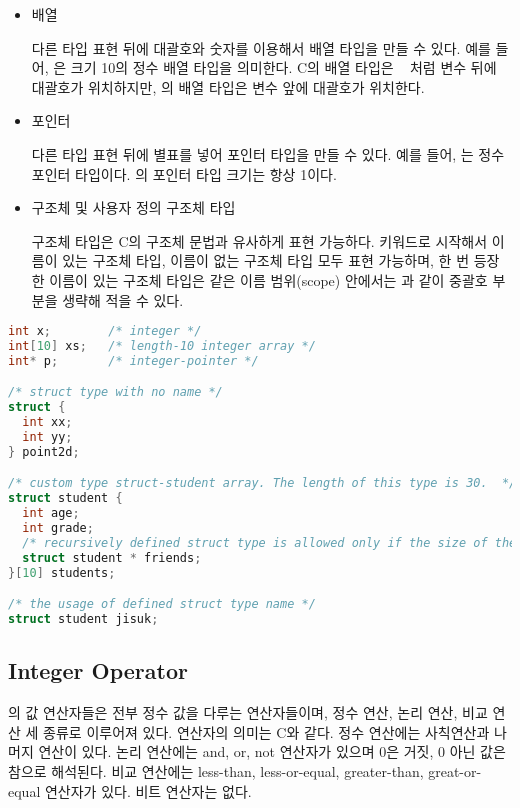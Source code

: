 \begin{itemize}
  \item 배열
  
  다른 타입 표현 뒤에 대괄호와 숫자를 이용해서 배열 타입을 만들 수 있다. 
  예를 들어, \CCint {} \CCrsbracket 은 크기 10의 정수 배열 타입을 의미한다. 
  C의 배열 타입은 \CCint \   \CCrsbracket 처럼 변수 뒤에 대괄호가 위치하지만, 
  \SubC 의 배열 타입은 변수 앞에 대괄호가 위치한다.
  
  \item 포인터
  
  다른 타입 표현 뒤에 별표를 넣어 포인터 타입을 만들 수 있다.
  예를 들어, \CCint \CCasterisk 는 정수 포인터 타입이다.
  \SubC 의 포인터 타입 크기는 항상 1이다. 
  
  \item 구조체 및 사용자 정의 구조체 타입
  
  구조체 타입은 C의 구조체 문법과 유사하게 표현 가능하다.
  \CCstruct 키워드로 시작해서 이름이 있는 구조체 타입, 이름이 없는 구조체 타입 모두 표현 가능하며,
  한 번 등장한 이름이 있는 구조체 타입은 같은 이름 범위(scope) 안에서는 
   과 같이 중괄호 부분을 생략해 적을 수 있다.
  
\end{itemize}


\begin{lstlisting}[language=C, caption=Type expression examples]
int x;        /* integer */
int[10] xs;   /* length-10 integer array */
int* p;       /* integer-pointer */

/* struct type with no name */
struct {
  int xx;
  int yy;
} point2d;

/* custom type struct-student array. The length of this type is 30.  */
struct student {
  int age;
  int grade;
  /* recursively defined struct type is allowed only if the size of the type is predictable. */
  struct student * friends;
}[10] students; 

/* the usage of defined struct type name */
struct student jisuk;
\end{lstlisting}




\subsection{Integer Operator}

\SubC 의 값 연산자들은 전부 정수 값을 다루는 연산자들이며, 정수 연산, 논리 연산, 비교 연산 세 종류로 이루어져 있다.
연산자의 의미는 C와 같다.
정수 연산에는 사칙연산과 나머지 연산이 있다. 
논리 연산에는 and, or, not 연산자가 있으며 0은 거짓, 0 아닌 값은 참으로 해석된다.
비교 연산에는 less-than, less-or-equal, greater-than, great-or-equal 연산자가 있다.
비트 연산자는 없다.


